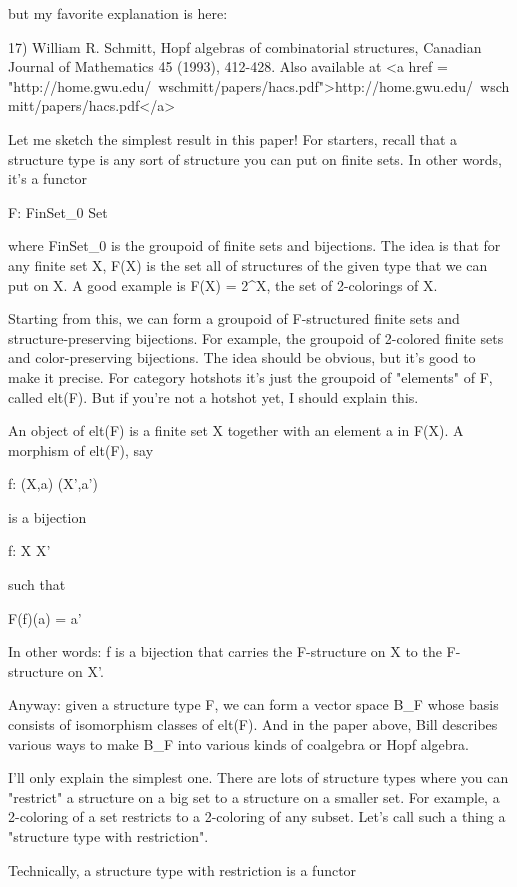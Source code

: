 but my favorite explanation is here:

17) William R. Schmitt, Hopf algebras of combinatorial structures,
Canadian Journal of Mathematics 45 (1993), 412-428.   Also available
at <a href = "http://home.gwu.edu/~wschmitt/papers/hacs.pdf">http://home.gwu.edu/~wschmitt/papers/hacs.pdf</a>

Let me sketch the simplest result in this paper!  For starters, recall 
that a structure type is any sort of structure you can put on finite 
sets.  In other words, it's a functor

F: FinSet_{0} \to  Set

where FinSet_{0} is the groupoid of finite sets and
bijections.  The idea is that for any finite set X, F(X) is the set
all of structures of the given type that we can put on X.  A good
example is F(X) = 2^{X}, the set of 2-colorings of X.

Starting from this, we can form a groupoid of F-structured finite sets
and structure-preserving bijections.  For example, the groupoid of
2-colored finite sets and color-preserving bijections.  The idea
should be obvious, but it's good to make it precise.  For category
hotshots it's just the groupoid of "elements" of F, called
elt(F).  But if you're not a hotshot yet, I should explain this.

An object of elt(F) is a finite set X together with an element a in 
F(X).  A morphism of elt(F), say

f: (X,a) \to  (X',a')

is a bijection 

f: X \to  X'

such that 

F(f)(a) = a'

In other words: f is a bijection that carries the F-structure on X
to the F-structure on X'.

Anyway: given a structure type F, we can form a vector space
B_{F} whose basis consists of isomorphism classes of elt(F).
And in the paper above, Bill describes various ways to make
B_{F} into various kinds of coalgebra or Hopf algebra.

I'll only explain the simplest one.  There are lots of structure types
where you can "restrict" a structure on a big set to a
structure on a smaller set.  For example, a 2-coloring of a set restricts
to a 2-coloring of any subset.  Let's call such a thing a "structure
type with restriction".

Technically, a structure type with restriction is a functor

